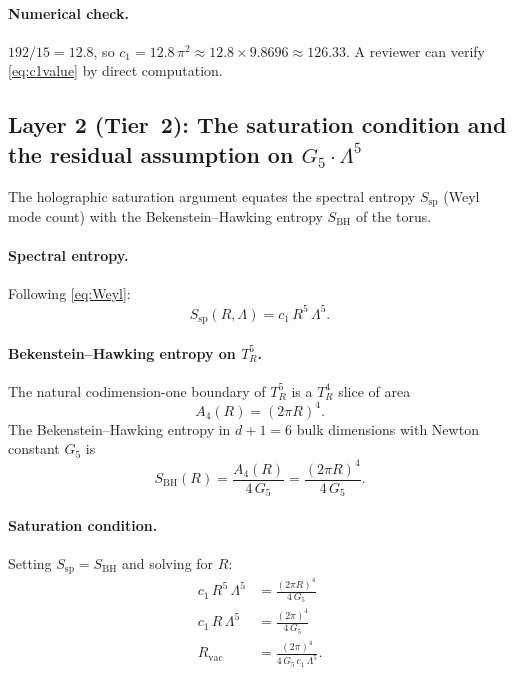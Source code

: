 \paragraph{Numerical check.}
$192/15 = 12.8$, so $c_1 = 12.8\,\pi^2 \approx 12.8 \times 9.8696
\approx 126.33$.  A reviewer can verify \cref{eq:c1value} by direct
computation.

\subsection{Layer 2 (Tier~2): The saturation condition and the
  residual assumption on $G_5\cdot\Lambda^5$}
\label{ssec:saturation}

The holographic saturation argument equates the spectral entropy
$S_{\mathrm{sp}}$ (Weyl mode count) with the Bekenstein--Hawking
entropy $S_{\mathrm{BH}}$ of the torus.

\paragraph{Spectral entropy.}
Following \cref{eq:Weyl}:
\begin{equation}
  S_{\mathrm{sp}}(R,\Lambda) = c_1\,R^5\,\Lambda^5.
\end{equation}

\paragraph{Bekenstein--Hawking entropy on $T^5_R$.}
The natural codimension-one boundary of $T^5_R$ is a $T^4_R$ slice of
area
\begin{equation}
  A_4(R) = (2\pi R)^4.
\end{equation}
The Bekenstein--Hawking entropy in $d+1=6$ bulk dimensions with
Newton constant $G_5$ is
\begin{equation}
  \label{eq:SBH}
  S_{\mathrm{BH}}(R) = \frac{A_4(R)}{4\,G_5}
                     = \frac{(2\pi R)^4}{4\,G_5}.
\end{equation}

\paragraph{Saturation condition.}
Setting $S_{\mathrm{sp}} = S_{\mathrm{BH}}$ and solving for $R$:
\begin{align}
  c_1\,R^5\,\Lambda^5 &= \frac{(2\pi R)^4}{4\,G_5}\nonumber\\
  c_1\,R\,\Lambda^5   &= \frac{(2\pi)^4}{4\,G_5}\nonumber\\
  \label{eq:Rvac}
  R_{\mathrm{vac}} &= \frac{(2\pi)^4}{4\,G_5\,c_1\,\Lambda^5}.
\end{align}


